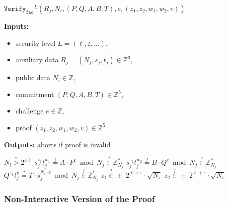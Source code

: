\documentclass[11pt]{article}
\newenvironment{inlineAlgorithm}{}{}
\newcommand{\algoName}[1]{#1 \par}
\newcommand{\algoInputsList}[1]{
    {\small \bf Inputs:} 
        \begin{itemize}[noitemsep,topsep=0pt]
            #1
        \end{itemize}
}
\newcommand{\algoOutputs}[1]{
    {\small \bf Outputs:} #1 \par
}
\newcommand{\verify}[1]{\ensuremath{\mathtt{Verify}_{\mathtt{#1}}}}
\newcommand{\Z}{\mathbb{Z}}
\newcommand{\?}[1]{\stackrel{?}{#1}}
\begin{document}
\begin{description}
\item
\begin{inlineAlgorithm}
\algoName{$\verify{fac}^L(
    R_j,
    N_i,
    (P, Q, A, B, T),
    e,
    (z_1, z_2, w_1, w_2, v)
)$}
\algoInputsList{
    \item security level $L = (\ell, \varepsilon, \dots)$,
    \item auxiliary data $R_j = (N_j, s_j, t_j) \in \Z^3$,
    \item public data $N_i \in \Z$,
    \item commitment $(P, Q, A, B, T) \in \Z^5$,
    \item challenge $e \in \Z$,
    \item proof $(z_1, z_2, w_1, w_2, v) \in \Z^5$
}
\algoOutputs{aborts if proof is invalid}
\begin{algorithmic}[1]
\State $N_i \? > 2^{4 \ell}$
\State $s_j^{z_1} t_j^{w_1} \? = A \cdot P^e \bmod N_j \? \in \Z^*_{N_j}$ 
\State $s_j^{z_2} t_j^{w_2} \? = B \cdot Q^e \bmod N_j \? \in \Z^*_{N_j}$
\State $Q^{z_1} t_j^{v} \? = T \cdot s_j^{N_i \cdot e} \bmod N_j \? \in \Z^*_{N_j}$ 
\State $z_1 \? \in \pm \; 2^{\ell + \varepsilon} \cdot \sqrt{N_i}$ 
\State $z_2 \? \in \pm \; 2^{\ell + \varepsilon} \cdot \sqrt{N_i}$
\end{algorithmic}
\end{inlineAlgorithm}

\end{description}

\subsubsection{Non-Interactive Version of the Proof}
\end{document}

